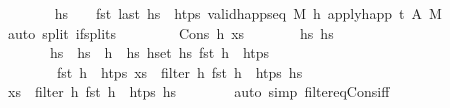 \begin{isabellebody}
\ \ \ \ \ \ \isamarkupfalse%
\ {\isacartoucheopen}hs{\isacharprime}{\kern0pt}\ {\isasymnoteq}\ {\isacharbrackleft}{\kern0pt}{\isacharbrackright}{\kern0pt}\ {\isasymLongrightarrow}\ fst\ {\isacharparenleft}{\kern0pt}last\ hs{\isacharprime}{\kern0pt}{\isacharparenright}{\kern0pt}\ {\isasymin}\ htps{\isacartoucheclose}\ {\isacartoucheopen}valid{\isacharunderscore}{\kern0pt}happ{\isacharunderscore}{\kern0pt}seq\ M\ {\isacharbrackleft}{\kern0pt}h{\isacharprime}{\kern0pt}{\isacharbrackright}{\kern0pt}\ {\isacharparenleft}{\kern0pt}apply{\isacharunderscore}{\kern0pt}happ\ {\isacharparenleft}{\kern0pt}t{\isacharcomma}{\kern0pt}\ A{\isacharprime}{\kern0pt}{\isacharparenright}{\kern0pt}\ M{\isacharparenright}{\kern0pt}{\isacartoucheclose}\isanewline
\ \ \ \ \ \ \isamarkupfalse%
\ {\isacharparenleft}{\kern0pt}auto\ split{\isacharcolon}{\kern0pt}\ if{\isacharunderscore}{\kern0pt}splits{\isacharparenright}{\kern0pt}\isanewline
\ \ \isamarkupfalse%
\isanewline
\ \ \ \ \isamarkupfalse%
\ {\isacharparenleft}{\kern0pt}Cons\ h{}\ xs{\isacharprime}{\kern0pt}{\isacharparenright}{\kern0pt}\isanewline
\ \ \ \ \isamarkupfalse%
\ \isamarkupfalse%
\ hs{}\ hs{}\isanewline
\ \ \ \ \ \ \ {\isachardoublequoteopen}hs{}\ {\isacharequal}{\kern0pt}\ hs{}\ {\isacharat}{\kern0pt}\ h{}\ {\isacharhash}{\kern0pt}\ hs{}{\isachardoublequoteclose}\ {\isachardoublequoteopen}{\isacharparenleft}{\kern0pt}{\isasymforall}h{\isasymin}set\ hs{}{\isachardot}{\kern0pt}\ fst\ h\ {\isasymnotin}\ htps{\isacharparenright}{\kern0pt}{\isachardoublequoteclose}\isanewline
\ \ \ \ \ \ \ \ {\isachardoublequoteopen}fst\ h{}\ {\isasymin}\ htps{\isachardoublequoteclose}\ {\isachardoublequoteopen}xs{\isacharprime}{\kern0pt}\ {\isacharequal}{\kern0pt}\ filter\ {\isacharparenleft}{\kern0pt}{\isasymlambda}h{\isachardot}{\kern0pt}\ fst\ h\ {\isasymin}\ htps{\isacharparenright}{\kern0pt}\ hs{}{\isachardoublequoteclose}\isanewline
\ \ \ \ \ \ \isamarkupfalse%
\ {\isacartoucheopen}xs\ {\isacharequal}{\kern0pt}\ filter\ {\isacharparenleft}{\kern0pt}{\isasymlambda}h{\isachardot}{\kern0pt}\ fst\ h\ {\isasymin}\ htps{\isacharparenright}{\kern0pt}\ hs{}{\isacartoucheclose}\isanewline
\ \ \ \ \ \ \isamarkupfalse%
\ {\isacharparenleft}{\kern0pt}auto\ simp{\isacharcolon}{\kern0pt}\ filter{\isacharunderscore}{\kern0pt}eq{\isacharunderscore}{\kern0pt}Cons{\isacharunderscore}{\kern0pt}iff{\isacharparenright}{\kern0pt}\isanewline

\end{isabellebody}
